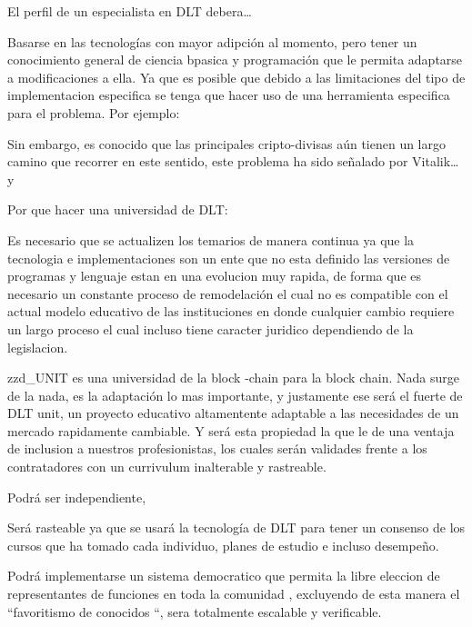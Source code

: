 \documentclass[a4paper,11pt,twoside]{article}
\begin{document}
El perfil de un especialista en DLT debera…

Basarse en las tecnologías con mayor adipción al momento, pero tener un conocimiento general de ciencia bpasica y programación que le permita adaptarse a modificaciones a ella. Ya que es posible que debido a las limitaciones del tipo de implementacion especifica se tenga que hacer uso de una herramienta especifica para el problema. Por ejemplo:

Sin embargo, es conocido que las principales cripto-divisas aún tienen un largo camino que recorrer en este sentido, este problema ha sido señalado por Vitalik… y 


Por que hacer una universidad de DLT:

Es necesario que se actualizen los temarios de manera continua ya que la tecnologia e implementaciones son un ente que no esta definido las versiones de programas y lenguaje estan en una evolucion muy rapida, de forma que es necesario un constante proceso de remodelación el cual no es compatible con el actual modelo educativo de las instituciones en donde cualquier cambio requiere un largo proceso el cual incluso tiene caracter juridico dependiendo de la legislacion.

zzd_UNIT es una universidad de la block -chain para la block chain. Nada surge de la nada, es la adaptación lo mas importante, y justamente ese será el fuerte de DLT unit, un proyecto educativo altamentente adaptable a las necesidades de un mercado rapidamente cambiable. Y será esta propiedad la que le de una ventaja de inclusion a nuestros profesionistas, los cuales serán validades frente a los contratadores con un currivulum inalterable y rastreable.

Podrá ser independiente,

Será rasteable ya que se usará la tecnología de DLT para tener un consenso de los cursos que ha tomado cada individuo, planes de estudio e incluso desempeño.

Podrá implementarse un sistema democratico que permita la libre eleccion de representantes de funciones en toda la comunidad , excluyendo de esta manera el “favoritismo de conocidos “, sera totalmente escalable y verificable. 
\end{document}
